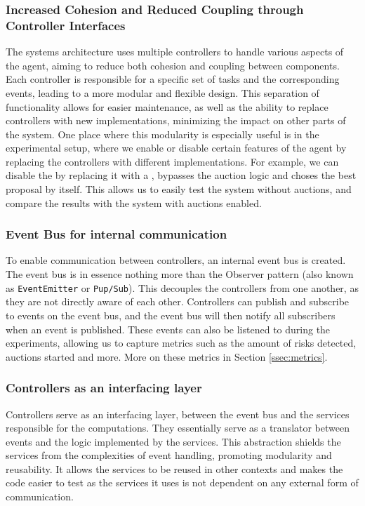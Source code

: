 \subsubsection{Increased Cohesion and Reduced Coupling through Controller Interfaces}
\label{sssec:reduced-cohesion-coupling}
The systems architecture uses multiple controllers to handle various aspects of the agent, aiming to reduce both cohesion and coupling between components. Each controller is responsible for a specific set of tasks and the corresponding events, leading to a more modular and flexible design. This separation of functionality allows for easier maintenance, as well as the ability to replace controllers with new implementations, minimizing the impact on other parts of the system. One place where this modularity is especially useful is in the experimental setup, where we enable or disable certain features of the agent by replacing the controllers with different implementations. For example, we can disable the  by replacing it with a , bypasses the auction logic and choses the best proposal by itself. This allows us to easily test the system without auctions, and compare the results with the system with auctions enabled.

\subsubsection{Event Bus for internal communication}
\label{sssec:event-bus}
To enable communication between controllers, an internal event bus is created. The event bus is in essence nothing more than the Observer pattern (also known as \texttt{EventEmitter} or \texttt{Pup/Sub})\cite{gamma1995design}. This decouples the controllers from one another, as they are not directly aware of each other. Controllers can publish and subscribe to events on the event bus, and the event bus will then notify all subscribers when an event is published. These events can also be listened to during the experiments, allowing us to capture metrics such as the amount of risks detected, auctions started and more. More on these metrics in Section \ref{ssec:metrics}.

\subsubsection{Controllers as an interfacing layer}
\label{sssec:controllers-interfacing-layer}
Controllers serve as an interfacing layer, between the event bus and the services responsible for the computations. They essentially serve as a translator between events and the logic implemented by the services. This abstraction shields the services from the complexities of event handling, promoting modularity and reusability. It allows the services to be reused in other contexts and makes the code easier to test as the services it uses is not dependent on any external form of communication.


